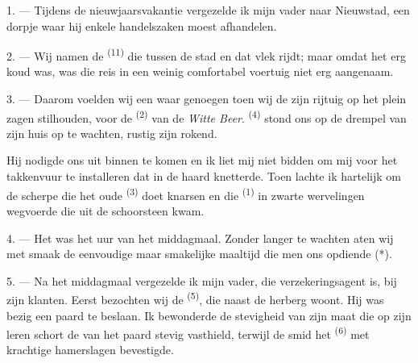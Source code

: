 

\VUsaut{4.0mm}
\VUsaut{3.0mm}
\VUfilet{16mm}
\VUsaut{5.6mm}
\VUsaut{3.0mm}

\VUsaut{3.0mm}

\VUsaut{4.0mm}

1. --- Tijdens de nieuwjaarsvakantie vergezelde ik mijn vader naar Nieuwstad, een dorpje waar
hij enkele handelszaken moest afhandelen.

2. --- Wij namen de  \textsuperscript{(11)} die tussen de stad en dat vlek
rijdt; maar omdat het erg koud was, was die reis in een weinig comfortabel voertuig niet erg
aangenaam.

3. --- Daarom voelden wij een waar genoegen toen wij de  zijn rijtuig op het
plein zagen stilhouden, voor de  \textsuperscript{(2)} van de \textit{Witte
Beer}.  \textsuperscript{(4)} stond ons op de drempel van zijn huis op
te wachten, rustig zijn  rokend.

Hij nodigde ons uit binnen te komen en ik liet mij niet bidden om mij voor het takkenvuur te
installeren dat in de haard knetterde. Toen lachte ik hartelijk om de scherpe
 die het oude  \textsuperscript{(3)} doet knarsen en
die  \textsuperscript{(1)} in zwarte wervelingen wegvoerde die uit de
schoorsteen kwam.

4. --- Het was het uur van het middagmaal. Zonder langer te wachten aten wij met smaak de
eenvoudige maar smakelijke maaltijd die men ons opdiende (*).

\VUsaut{3.0mm}

5. --- Na het middagmaal vergezelde ik mijn vader, die verzekeringsagent is, bij zijn klanten.
Eerst bezochten wij de  \textsuperscript{(5)}, die naast de herberg woont. Hij
was bezig een paard te beslaan. Ik bewonderde de stevigheid van zijn maat die op zijn leren
schort de  van het paard stevig vasthield, terwijl de smid het 
\textsuperscript{(6)} met krachtige hamerslagen bevestigde.


